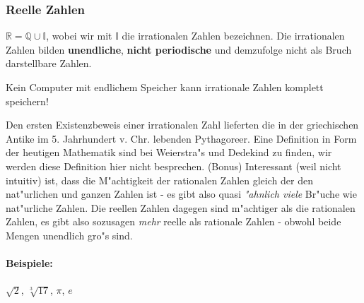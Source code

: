 \subsubsection{Reelle Zahlen}
$\mathbb{R} = \mathbb{Q} \cup \mathbb{I}$, wobei wir mit $\mathbb{I}$ die irrationalen Zahlen bezeichnen. Die irrationalen Zahlen bilden \textbf{unendliche}, \textbf{nicht periodische} und demzufolge nicht als Bruch darstellbare Zahlen. 
\begin{center}
Kein Computer mit endlichem Speicher kann irrationale Zahlen komplett speichern!
\end{center}
Den ersten Existenzbeweis einer irrationalen Zahl lieferten die in der griechischen Antike im 5. Jahrhundert v. Chr. lebenden Pythagoreer. Eine Definition in Form der heutigen Mathematik sind bei Weierstra"s und Dedekind zu finden, wir werden diese Definition hier nicht besprechen.  (Bonus) Interessant (weil nicht intuitiv) ist, dass die M"achtigkeit der rationalen Zahlen gleich der den nat"urlichen und ganzen Zahlen ist - es gibt also quasi \textit{"ahnlich viele} Br"uche wie nat"urliche Zahlen. Die reellen Zahlen dagegen sind m"achtiger als die rationalen Zahlen, es gibt also sozusagen \textit{mehr} reelle als rationale Zahlen - obwohl beide Mengen unendlich gro"s sind.
\paragraph{Beispiele: } $\sqrt{2}$, $\sqrt[3]{17}$, $\pi$, $e$



